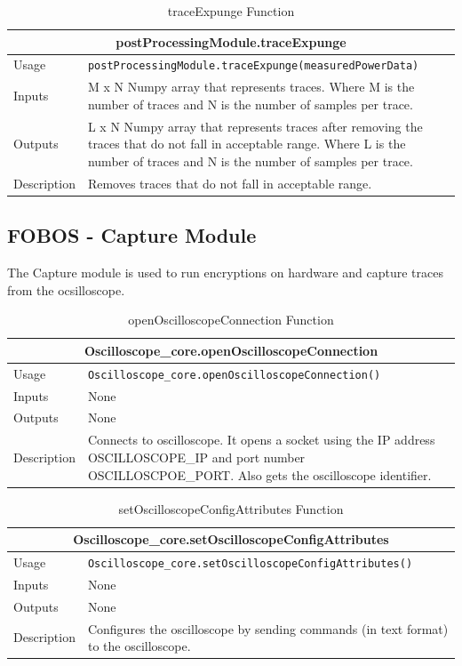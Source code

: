 \documentclass{llncs}
\numberwithin{algorithm}{chapter}
\begin{document}
\begin{table}[H]
\caption{traceExpunge Function}
\begin{tabular}{ |p{2cm}||p{11cm}|  }
 \hline
 \multicolumn{2}{|c|}{\cellcolor{teal}\textbf{postProcessingModule.traceExpunge}} \\
 \hline
 Usage & \texttt{postProcessingModule.traceExpunge(measuredPowerData)}\\ \hline
 Inputs & M x N Numpy array that represents traces. Where M is the number of traces and N is the number of samples per trace. \\ \hline
 Outputs & L x N Numpy array that represents traces after removing the traces that do not fall in acceptable range. Where L is the number of traces and N is the number of samples per trace.  \\ \hline
 Description & Removes traces that do not fall in acceptable range. \\ \hline
\end{tabular}
\end{table}


\subsection{FOBOS - Capture Module}

The Capture module is used to run encryptions on hardware and capture traces from the ocsilloscope.

\begin{table}[H]
\caption{openOscilloscopeConnection Function}
\begin{tabular}{ |p{2cm}||p{11cm}|  }
 \hline
 \multicolumn{2}{|c|}{\cellcolor{teal}\textbf{Oscilloscope\_core.openOscilloscopeConnection}} \\
 \hline
 Usage & \texttt{Oscilloscope\_core.openOscilloscopeConnection()}\\ \hline
 Inputs & None  \\ \hline
 Outputs &  None \\ \hline
 Description & Connects to oscilloscope. It opens a socket using the IP address OSCILLOSCOPE\_IP and port number OSCILLOSCPOE\_PORT. Also gets the oscilloscope identifier. \\ \hline
\end{tabular}
\end{table}

\begin{table}[H]
\caption{setOscilloscopeConfigAttributes Function}
\begin{tabular}{ |p{2cm}||p{11cm}|  }
 \hline
 \multicolumn{2}{|c|}{\cellcolor{teal}\textbf{Oscilloscope\_core.setOscilloscopeConfigAttributes}} \\
 \hline
 Usage & \texttt{Oscilloscope\_core.setOscilloscopeConfigAttributes()}\\ \hline
 Inputs & None  \\ \hline
 Outputs &  None \\ \hline
 Description & Configures the oscilloscope by sending commands (in text format) to the oscilloscope. \\ \hline
\end{tabular}
\end{table}
\end{document}
